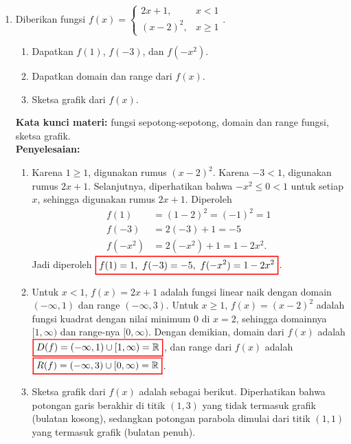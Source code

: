 \documentclass[10pt,openany,a4paper]{article}
\theoremstyle{definition}
\theoremstyle{definition}
\theoremstyle{plain}
\newenvironment{jawab}[2][tes]{%
\par\noindent\textbf{Kata kunci materi:} #1.\\
\textbf{Penyelesaian:} #2%
}{}
\begin{document}
\begin{enumerate}
    \item Diberikan fungsi $f(x)=\begin{cases}
        2x+1, & x<1\\
        (x-2)^2, & x\geq 1
    \end{cases}$.
    \begin{enumerate}
        \item Dapatkan $f(1)$, $f(-3)$, dan $f(-x^2)$.
        \item Dapatkan domain dan range dari $f(x)$.
        \item Sketsa grafik dari $f(x)$.
    \end{enumerate}
    \begin{jawab}[fungsi sepotong-sepotong, domain dan range fungsi, sketsa grafik]{
        \begin{enumerate}
            \item Karena $1\geq 1$, digunakan rumus $(x-2)^2$. Karena $-3<1$, digunakan rumus $2x+1$. Selanjutnya, diperhatikan bahwa $-x^2\leq 0 < 1$ untuk setiap $x$, sehingga digunakan rumus $2x+1$. Diperoleh
            \begin{align*}
                f(1) &= (1-2)^2 = (-1)^2 = 1\\
                f(-3) &= 2(-3)+1 = -5\\
                f(-x^2) &= 2(-x^2)+1 = 1-2x^2.
            \end{align*}
            Jadi diperoleh $\colorlet{oldcolor}{.}
        \color{red}
        \setlength{\fboxrule}{1pt} \boxed{\color{oldcolor}f(1)=1,~f(-3)=-5,~f(-x^2)=1-2x^2}\color{oldcolor}$.
            \item Untuk $x<1$, $f(x)=2x+1$ adalah fungsi linear naik dengan domain $(-\infty,1)$ dan range $(-\infty,3)$. Untuk $x\geq 1$, $f(x)=(x-2)^2$ adalah fungsi kuadrat dengan nilai minimum $0$ di $x=2$, sehingga domainnya $[1,\infty)$ dan range-nya $[0,\infty)$. Dengan demikian, domain dari $f(x)$ adalah $\colorlet{oldcolor}{.}
        \color{red}
        \setlength{\fboxrule}{1pt} \boxed{\color{oldcolor}D(f)=(-\infty,1)\cup[1,\infty) = \mathbb{R}}\color{oldcolor}$, dan range dari $f(x)$ adalah $\colorlet{oldcolor}{.}
        \color{red}
        \setlength{\fboxrule}{1pt} \boxed{\color{oldcolor}R(f)=(-\infty,3)\cup[0,\infty) = \mathbb{R}}\color{oldcolor}$.
            \item Sketsa grafik dari $f(x)$ adalah sebagai berikut. Diperhatikan bahwa potongan garis berakhir di titik $(1,3)$ yang tidak termasuk grafik (bulatan kosong), sedangkan potongan parabola dimulai dari titik $(1,1)$ yang termasuk grafik (bulatan penuh).

\end{enumerate}}
\end{jawab}
\end{enumerate}
\end{document}
